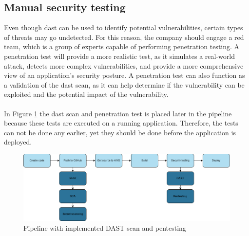 \subsection{Manual security testing}


Even though \acrshort{dast} can be used to identify potential vulnerabilities, certain types of threats may go undetected. For this reason, the company should engage a red team, which is a group of experts capable of performing penetration testing. A penetration test will provide a more realistic test, as it simulates a real-world attack, detects more complex vulnerabilities, and provide a more comprehensive view of an application's security posture. A penetration test can also function as a validation of the \acrshort{dast} scan, as it can help determine if the vulnerability can be exploited and the potential impact of the vulnerability. \cite{dastpentesting}
\\~\\
In Figure \ref{fig: Pipeline with implemented DAST scan and pentesting} the \acrshort{dast} scan and penetration test is placed later in the pipeline because these tests are executed on a running application. Therefore, the tests can not be done any earlier, yet they should be done before the application is deployed.
\vspace{2mm}
\begin{figure}[H]
    \centering
    \includegraphics[width=0.8\columnwidth]{Images/pipeline5.png}
    \caption{Pipeline with implemented DAST scan and pentesting}
    \label{fig: Pipeline with implemented DAST scan and pentesting}
\end{figure}

